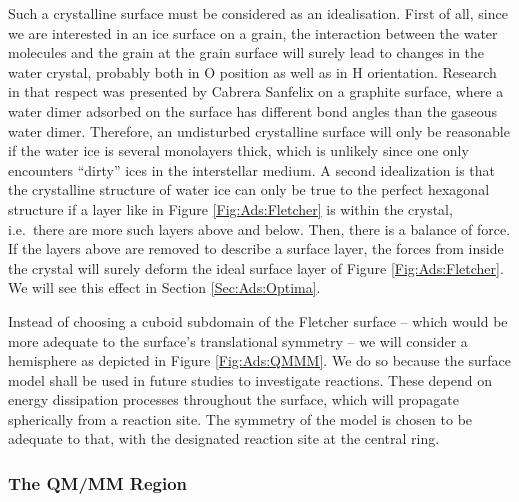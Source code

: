 \documentclass[8.5pt,twoside,twocolumn]{article}
\theoremstyle{standard}
\begin{document}
Such a crystalline surface must be considered as an idealisation. First of all,
since we are interested in an ice surface on a grain, the interaction between
the water molecules and the grain at the grain surface will surely lead to
changes in the water crystal, probably both in O position as well as in H
orientation.
Research in that respect was presented by Cabrera Sanfelix
\etal\cite{CabreraSanfelix2003} on a graphite surface, where a water dimer
adsorbed on the surface has different bond angles than the gaseous water dimer.
Therefore, an undisturbed crystalline surface will only be reasonable if the
water ice is several monolayers thick, which is unlikely since one only
encounters ``dirty'' ices in the interstellar
medium\cite{BoogertGerakinesWhittet2015}.
A second idealization is that the crystalline structure of water ice can only be true to the perfect hexagonal structure if a layer like
in Figure \ref{Fig:Ads:Fletcher} is within the crystal, i.e.\ there are more
such layers above and below. Then, there is a balance of force. If the layers
above are removed to describe a surface layer, the forces from inside the
crystal will surely deform the ideal surface layer of Figure
\ref{Fig:Ads:Fletcher}.
We will see this effect in Section \ref{Sec:Ads:Optima}.

Instead of choosing a cuboid subdomain of the Fletcher surface -- which would be more adequate
to the surface's translational symmetry -- we will consider a hemisphere as depicted in Figure
\ref{Fig:Ads:QMMM}. We do so because the surface model shall be used in future studies
to investigate reactions. These depend on energy dissipation processes throughout the
surface, which will propagate spherically from a reaction site. The symmetry of the model
is chosen to be adequate to that, with the designated reaction site at the
central ring.

\subsubsection{The QM/MM Region}
\label{Sec:Ads:QM/MM}
\end{document}
